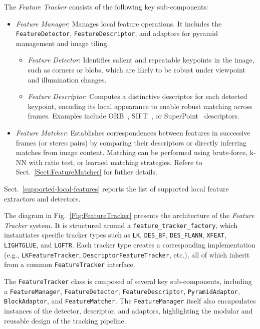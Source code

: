\documentclass{article}
\begin{document}
The \textit{Feature Tracker} consists of the following key sub-components:

\begin{itemize} 
\item \textit{Feature Manager}: Manages local feature operations. It includes the \texttt{FeatureDetector}, \texttt{FeatureDescriptor}, and adaptors for pyramid management and image tiling. 
\begin{itemize}
\item \textit{Feature Detector}: Identifies salient and repeatable keypoints in the image, such as corners or blobs, which are likely to be robust under viewpoint and illumination changes. 

\item \textit{Feature Descriptor}: Computes a distinctive descriptor for each detected keypoint, encoding its local appearance to enable robust matching across frames. Examples include ORB~\cite{rublee2011orb}, SIFT~\cite{lowe1999object}, or SuperPoint~\cite{detone18superpoint} descriptors.

\end{itemize}

\item \textit{Feature Matcher}: Establishes correspondences between features in successive frames (or stereo pairs) by comparing their descriptors or directly inferring matches from image content. Matching can be performed using brute-force, k-NN with ratio test, or learned matching strategies. Refere to Sect.~\ref{Sect:FeatureMatcher} for futher details.
\end{itemize}

Sect.~\ref{supported-local-features} reports the list of supported local feature extractors and detectors.

The diagram in Fig.~\ref{Fig:FeatureTracker} presents the architecture of the \textit{Feature Tracker} system. It is structured around a \texttt{feature\_tracker\_factory}, which instantiates specific tracker types such as \texttt{LK}, \texttt{DES\_BF}, \texttt{DES\_FLANN}, \texttt{XFEAT}, \texttt{LIGHTGLUE}, and \texttt{LOFTR}. Each tracker type creates a corresponding implementation (e.g., \texttt{LKFeatureTracker}, \texttt{DescriptorFeatureTracker}, etc.), all of which inherit from a common \texttt{FeatureTracker} interface.

The \texttt{FeatureTracker} class is composed of several key sub-components, including a \texttt{FeatureManager}, \texttt{FeatureDetector}, \texttt{FeatureDescriptor}, \texttt{PyramidAdaptor}, \texttt{BlockAdaptor}, and \texttt{FeatureMatcher}. The \texttt{FeatureManager} itself also encapsulates instances of the detector, descriptor, and adaptors, highlighting the modular and reusable design of the tracking pipeline.
\end{document}
